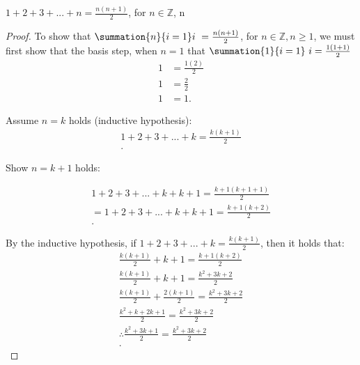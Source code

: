 \documentclass{report}
\begin{document}
    \bigbreak \noindent 
    \begin{prop}
       $1+2+3+...+n = \frac{n(n+1)}{2}$, for $n \in \mathbb{Z}$, n  
    \end{prop}
    \bigbreak \noindent 
    \begin{proof}
       To show that $\summation{n}{i=1}i \  = \frac{n(n+1)}{2}$, for $n \in \mathbb{Z}, n \geq 1$, we must first show that the basis step, when $n=1$  that $\summation{1}{i=1}\ i = \frac{1(1+1)}{2} \ $
       \begin{align*}
           1 &= \frac{1(2)}{2} \\
           1 &= \frac{2}{2} \\
           1 &= 1
       .\end{align*}

       \bigbreak \noindent 

       Assume $n=k$ holds (inductive hypothesis): 
       \begin{align*}
           1+2+3+...+k = \frac{k(k+1)}{2} \\
       .\end{align*}
       \bigbreak \noindent 

       Show $n=k+1$ holds:

       \begin{align*}
           1+2+3+...+k+k+1 = \frac{k+1(k+1+1)}{2} \\
           = 1+2+3+...+k+k+1 = \frac{k+1(k+2)}{2} \\
       .\end{align*}
       \bigbreak \noindent 

       By the inductive hypothesis, if $1+2+3+...+k = \frac{k(k+1)}{2}$, then it holds that:
       \begin{align*}
           \frac{k(k+1)}{2} + k + 1 = \frac{k+1(k+2)}{2} \\
           \frac{k(k+1)}{2} + k + 1 = \frac{k^{2}+3k+2}{2} \\
            \frac{k(k+1)}{2} + \frac{2(k+1)}{2} = \frac{k^{2}+3k+2}{2} \\
            \frac{k^{2}+k+2k+1}{2} = \frac{k^{2}+3k+2}{2} \\
            \therefore \frac{k^{2}+3k+1}{2} = \frac{k^{2}+3k+2}{2} \\
       .\end{align*}
       \bigbreak \noindent 
       \ep

    \end{proof}
\end{document}
